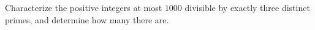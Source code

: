 Characterize the positive integers at most $ 1000 $ divisible by exactly three distinct primes, and determine how many there are.
